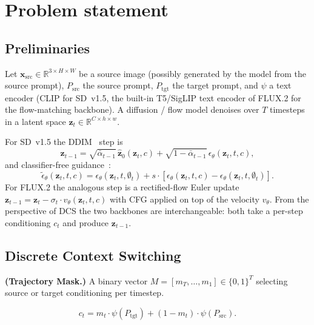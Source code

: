 \chapter{Problem statement}

\section{Preliminaries}

Let $\mathbf{x}_{\text{src}} \in \mathbb{R}^{3 \times H \times W}$ be a source image (possibly generated by the model from the source prompt), $P_{\text{src}}$ the source prompt, $P_{\text{tgt}}$ the target prompt, and $\psi$ a text encoder (CLIP for SD~v1.5, the built-in T5/SigLIP text encoder of FLUX.2 for the flow-matching backbone). A diffusion / flow model denoises over $T$ timesteps in a latent space $\mathbf{z}_t \in \mathbb{R}^{C \times h \times w}$.

For SD~v1.5 the DDIM~\cite{song2020denoising} step is
\begin{equation}
    \mathbf{z}_{t-1} = \sqrt{\bar{\alpha}_{t-1}}\,\hat{\mathbf{z}}_0(\mathbf{z}_t, c) + \sqrt{1 - \bar{\alpha}_{t-1}}\,\epsilon_\theta(\mathbf{z}_t, t, c),
    \label{eq::ddim_step}
\end{equation}
and classifier-free guidance~\cite{ho2022classifier}:
\begin{equation}
    \tilde{\epsilon}_\theta(\mathbf{z}_t, t, c) = \epsilon_\theta(\mathbf{z}_t, t, \emptyset_t) + s \cdot \left[\epsilon_\theta(\mathbf{z}_t, t, c) - \epsilon_\theta(\mathbf{z}_t, t, \emptyset_t)\right].
    \label{eq::cfg}
\end{equation}
For FLUX.2 the analogous step is a rectified-flow Euler update $\mathbf{z}_{t-1} = \mathbf{z}_t - \sigma_t \cdot v_\theta(\mathbf{z}_t, t, c)$ with CFG applied on top of the velocity $v_\theta$. From the perspective of DCS the two backbones are interchangeable: both take a per-step conditioning $c_t$ and produce $\mathbf{z}_{t-1}$.

\section{Discrete Context Switching}

\begin{Def}
\textbf{(Trajectory Mask.)} A binary vector $M = [m_T, \dots, m_1] \in \{0, 1\}^T$ selecting source or target conditioning per timestep.
\end{Def}

\begin{equation}
    c_t = m_t \cdot \psi(P_{\text{tgt}}) + (1 - m_t) \cdot \psi(P_{\text{src}}).
    \label{eq::context_switch}
\end{equation}

